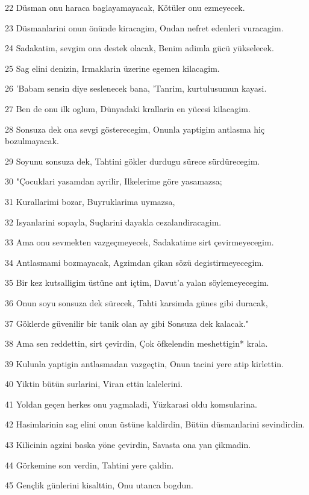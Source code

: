 \par 22 Düsman onu haraca baglayamayacak, Kötüler onu ezmeyecek.
\par 23 Düsmanlarini onun önünde kiracagim, Ondan nefret edenleri vuracagim.
\par 24 Sadakatim, sevgim ona destek olacak, Benim adimla gücü yükselecek.
\par 25 Sag elini denizin, Irmaklarin üzerine egemen kilacagim.
\par 26 'Babam sensin diye seslenecek bana, 'Tanrim, kurtulusumun kayasi.
\par 27 Ben de onu ilk oglum, Dünyadaki krallarin en yücesi kilacagim.
\par 28 Sonsuza dek ona sevgi gösterecegim, Onunla yaptigim antlasma hiç bozulmayacak.
\par 29 Soyunu sonsuza dek, Tahtini gökler durdugu sürece sürdürecegim.
\par 30 "Çocuklari yasamdan ayrilir, Ilkelerime göre yasamazsa;
\par 31 Kurallarimi bozar, Buyruklarima uymazsa,
\par 32 Isyanlarini sopayla, Suçlarini dayakla cezalandiracagim.
\par 33 Ama onu sevmekten vazgeçmeyecek, Sadakatime sirt çevirmeyecegim.
\par 34 Antlasmami bozmayacak, Agzimdan çikan sözü degistirmeyecegim.
\par 35 Bir kez kutsalligim üstüne ant içtim, Davut'a yalan söylemeyecegim.
\par 36 Onun soyu sonsuza dek sürecek, Tahti karsimda günes gibi duracak,
\par 37 Göklerde güvenilir bir tanik olan ay gibi Sonsuza dek kalacak."
\par 38 Ama sen reddettin, sirt çevirdin, Çok öfkelendin meshettigin* krala.
\par 39 Kulunla yaptigin antlasmadan vazgeçtin, Onun tacini yere atip kirlettin.
\par 40 Yiktin bütün surlarini, Viran ettin kalelerini.
\par 41 Yoldan geçen herkes onu yagmaladi, Yüzkarasi oldu komsularina.
\par 42 Hasimlarinin sag elini onun üstüne kaldirdin, Bütün düsmanlarini sevindirdin.
\par 43 Kilicinin agzini baska yöne çevirdin, Savasta ona yan çikmadin.
\par 44 Görkemine son verdin, Tahtini yere çaldin.
\par 45 Gençlik günlerini kisalttin, Onu utanca bogdun.
